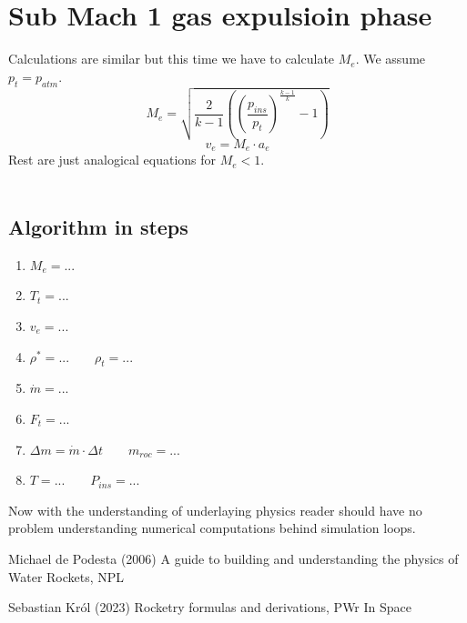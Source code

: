 \documentclass{report}
\begin{document}
\section{Sub Mach 1 gas expulsioin phase}
Calculations are similar but this time we have to calculate $M_e$. We assume $p_t = p_{atm}$.
$$M_e = \sqrt{\frac{2}{k-1}\left(\left(\frac{p_{ins}}{p_t}\right)^{\frac{k-1}{k}}-1\right)}$$
$$v_e = M_e\cdot a_e$$
Rest are just analogical equations for $M_e < 1$.\\\\

\subsection*{Algorithm in steps}
\begin{enumerate}
\item $M_e=...$
\item $T_t = ...$
\item $v_e = ...$
\item $\rho^* = ... \qquad \rho_t = ...$
\item $\dot{m} = ...$
\item $F_t = ...$
\item $\Delta m = \dot{m}\cdot \Delta t \qquad m_{roc} = ...$
\item $T = ...\qquad P_{ins} = ...$
\end{enumerate}
Now with the understanding of underlaying physics reader should have no problem understanding numerical computations behind simulation loops.

\begin{thebibliography}{9}
Michael de Podesta (2006) A guide to building and understanding the physics of Water Rockets, NPL

Sebastian Król (2023) Rocketry formulas and derivations, PWr In Space
\end{thebibliography}
\end{document}

